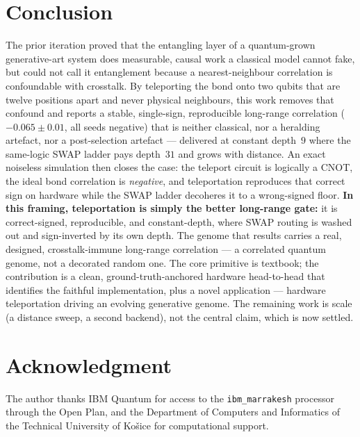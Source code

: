 \documentclass[conference]{IEEEtran}
\begin{document}
\section{Conclusion}

The prior iteration proved that the entangling layer of a quantum-grown generative-art
system does measurable, causal work a classical model cannot fake, but could not call it
entanglement because a nearest-neighbour correlation is confoundable with crosstalk. By
teleporting the bond onto two qubits that are twelve positions apart and never physical
neighbours, this work removes that confound and reports a stable, single-sign, reproducible
long-range correlation ($-0.065\pm0.01$, all seeds negative) that is neither classical, nor
a heralding artefact, nor a post-selection artefact --- delivered at constant depth~$9$
where the same-logic SWAP ladder pays depth~$31$ and grows with distance. An exact
noiseless simulation then closes the case: the teleport circuit is logically a CNOT, the
ideal bond correlation is \emph{negative}, and teleportation reproduces that correct sign
on hardware while the SWAP ladder decoheres it to a wrong-signed floor. \textbf{In this
framing, teleportation is simply the better long-range gate:} it is correct-signed,
reproducible, and constant-depth, where SWAP routing is washed out and sign-inverted by its
own depth. The genome that results carries a real, designed, crosstalk-immune long-range
correlation --- a correlated quantum genome, not a decorated random one. The core primitive
is textbook; the contribution is a clean, ground-truth-anchored hardware head-to-head that
identifies the faithful implementation, plus a novel application --- hardware teleportation
driving an evolving generative genome. The remaining work is scale (a distance sweep, a
second backend), not the central claim, which is now settled.

\section*{Acknowledgment}

The author thanks IBM Quantum for access to the \texttt{ibm\_marrakesh} processor through
the Open Plan, and the Department of Computers and Informatics of the Technical University
of Ko\v{s}ice for computational support.
\end{document}
